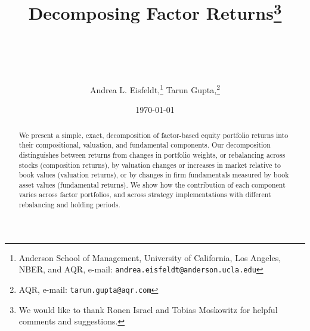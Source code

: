 \documentclass[12pt]{article}
\begin{document}
\thispagestyle{empty}
\begin{titlepage}

\title{\textbf{Decomposing Factor Returns}\thanks{We would like to thank Ronen Israel and Tobias Moskowitz for helpful comments and suggestions.}  \author{ Andrea L. Eisfeldt,\footnote{Anderson School of Management, University of California, Los Angeles,  NBER, and AQR, e-mail: {\tt andrea.eisfeldt@anderson.ucla.edu}} Tarun Gupta,\footnote{AQR, e-mail: {\tt tarun.gupta@aqr.com}}} \\
}\date{\today}

\maketitle

\begin{abstract} \vspace{\baselineskip}
We present a simple, exact, decomposition of factor-based equity portfolio returns into their compositional, valuation, and fundamental components.  
Our decomposition distinguishes between returns from changes in portfolio weights, or rebalancing across stocks (composition returns), by valuation changes or increases in market relative to book values (valuation returns), or by changes in firm fundamentals measured by book asset values (fundamental returns).
We show how the contribution of each component varies across factor portfolios, and across strategy implementations with different rebalancing and holding periods.
\end{abstract}

\end{titlepage}

\onehalfspacing
\clearpage
\end{document}
